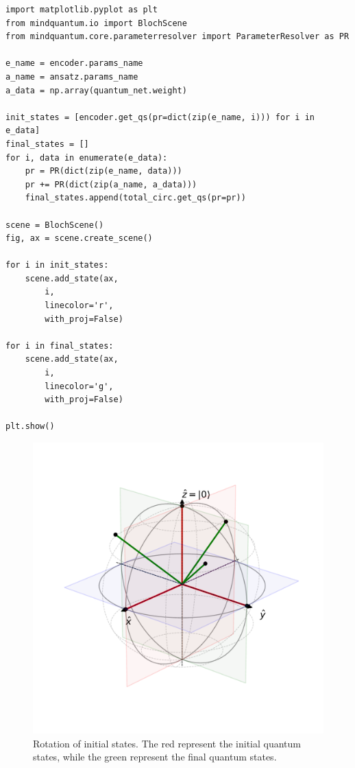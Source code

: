 \begin{lstlisting}
import matplotlib.pyplot as plt
from mindquantum.io import BlochScene
from mindquantum.core.parameterresolver import ParameterResolver as PR

e_name = encoder.params_name
a_name = ansatz.params_name
a_data = np.array(quantum_net.weight)

init_states = [encoder.get_qs(pr=dict(zip(e_name, i))) for i in e_data]
final_states = []
for i, data in enumerate(e_data):
    pr = PR(dict(zip(e_name, data)))
    pr += PR(dict(zip(a_name, a_data)))
    final_states.append(total_circ.get_qs(pr=pr))

scene = BlochScene()
fig, ax = scene.create_scene()

for i in init_states:
    scene.add_state(ax,
        i,
        linecolor='r',
        with_proj=False)

for i in final_states:
    scene.add_state(ax,
        i,
        linecolor='g',
        with_proj=False)

plt.show()
\end{lstlisting}

\begin{figure}[ht]
  \centering
  \includegraphics[scale=0.48]{./images/3_1_result.pdf}
  \caption{\label{3_1_vqa} Rotation of initial states. The red represent the initial quantum states, while the green represent the final quantum states.}
\end{figure}

